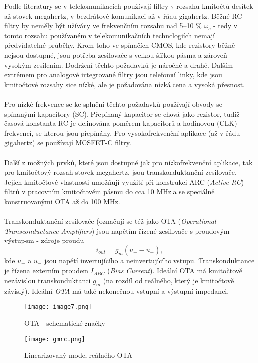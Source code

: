 Podle literatury \cite{19} se v telekomunikacích používají filtry v rozsahu kmitočtů desítek až stovek megahertz, v bezdrátové komunikaci až v řádu gigahertz. Běžné RC filtry by neměly být užívány ve frekvenčním rozsahu nad 5--10 $\%$ $\omega _c$ - tedy v tomto rozsahu používaném v telekomunikačních technologiích nemají předvídatelné průběhy. Krom toho ve spínačích CMOS, kde rezistory běžně nejsou dostupné, jsou potřeba zesilovače s velkou šířkou pásma a zároveň vysokým zesílením. Dodržení těchto požadavků je náročné a drahé. Dalším extrémem pro analogové integrované filtry jsou telefonní linky, kde jsou kmitočtové rozsahy sice nízké, ale je požadována nízká cena a vysoká přesnost.\\
\\
Pro nízké frekvence se ke splnění těchto požadavků používají obvody se spínanými kapacitory (SC). Přepínaný kapacitor se chová jako rezistor, tudíž časová konstanta RC je definována poměrem kapacitorů a hodinovou (CLK) frekvencí, se kterou jsou přepínány. Pro vysokofrekvenční aplikace (až v řádu gigahertz) se používají MOSFET-C filtry.\\
\\
Další z možných prvků, které jsou dostupné jak pro nízkofrekvenční aplikace, tak pro kmitočtový rozsah stovek megahertz, jsou transkonduktanční zesilovače. Jejich kmitočtové vlastnosti umožňují využití při konstrukci ARC (\textit{Active RC}) filtrů v pracovním kmitočtovém pásmu do cca 10 MHz a se speciálně konstruovanými OTA až do 100 MHz.\\
\\
Transkonduktanční zesilovače (označují se též jako OTA (\textit{Operational Transconductance Amplifiers}) jsou napětím řízené zesilovače s proudovým výstupem - zdroje proudu
\begin{equation}
i_{out} = g_m(u_+ - u_-),
\end{equation}
kde $u_+$ a $u_-$ jsou napětí invertujícího a neinvertujícího vstupu.  Transkonduktance je řízena externím proudem $I_{ABC}$ (\textit{Bias Current}). Ideální OTA má kmitočtově nezávislou transkonduktanci $g_m$ (na rozdíl od reálného, který je kmitočtově závislý). Ideální \textit{OTA} má také nekonečnou vstupní a výstupní impedanci.
\begin{figure}[h]
\centering
\texttt{[image: image7.png]}
\caption[OTA - schematické značky]{OTA - schematické značky \cite{11}}
\end{figure}
\begin{figure}[h]
\centering
\texttt{[image: gmrc.png]}
\caption[Linearizovaný model reálného OTA]{Linearizovaný model reálného OTA \cite{12}}
\end{figure}
